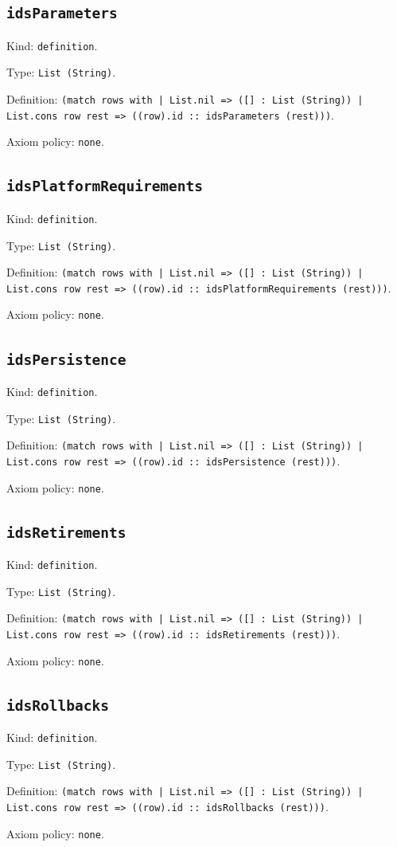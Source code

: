 \documentclass[11pt]{article}
\begin{document}
\subsection*{\texttt{idsParameters}}
\noindent Kind: \texttt{definition}.\par
\noindent Type: \texttt{List (String)}.\par
\noindent Definition: \texttt{(match rows with | List.nil => ([] : List (String)) | List.cons row rest => ((row).id :: idsParameters (rest)))}.\par
\noindent Axiom policy: \texttt{none}.\par
\subsection*{\texttt{idsPlatformRequirements}}
\noindent Kind: \texttt{definition}.\par
\noindent Type: \texttt{List (String)}.\par
\noindent Definition: \texttt{(match rows with | List.nil => ([] : List (String)) | List.cons row rest => ((row).id :: idsPlatformRequirements (rest)))}.\par
\noindent Axiom policy: \texttt{none}.\par
\subsection*{\texttt{idsPersistence}}
\noindent Kind: \texttt{definition}.\par
\noindent Type: \texttt{List (String)}.\par
\noindent Definition: \texttt{(match rows with | List.nil => ([] : List (String)) | List.cons row rest => ((row).id :: idsPersistence (rest)))}.\par
\noindent Axiom policy: \texttt{none}.\par
\subsection*{\texttt{idsRetirements}}
\noindent Kind: \texttt{definition}.\par
\noindent Type: \texttt{List (String)}.\par
\noindent Definition: \texttt{(match rows with | List.nil => ([] : List (String)) | List.cons row rest => ((row).id :: idsRetirements (rest)))}.\par
\noindent Axiom policy: \texttt{none}.\par
\subsection*{\texttt{idsRollbacks}}
\noindent Kind: \texttt{definition}.\par
\noindent Type: \texttt{List (String)}.\par
\noindent Definition: \texttt{(match rows with | List.nil => ([] : List (String)) | List.cons row rest => ((row).id :: idsRollbacks (rest)))}.\par
\noindent Axiom policy: \texttt{none}.\par
\end{document}
